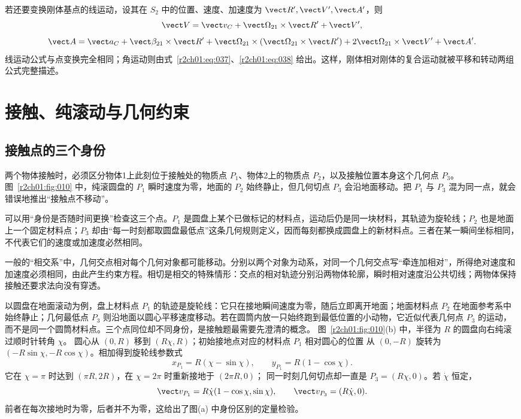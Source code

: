 若还要变换刚体基点的线运动，设其在 $S_2$ 中的位置、速度、加速度为
$\vect R',\vect V',\vect A'$，则
\[
  \vect V=\vect v_C+\vect\Omega_{21}\times\vect R'+\vect V',
\]
\[
  \vect A=\vect a_C+\vect\beta_{21}\times\vect R'
  +\vect\Omega_{21}\times(\vect\Omega_{21}\times\vect R')
  +2\vect\Omega_{21}\times\vect V'+\vect A'.
\]
线运动公式与点变换完全相同；角运动则由式~\eqref{r2ch01:eq:037}、\eqref{r2ch01:eq:038} 给出。这样，刚体相对刚体的复合运动就被平移和转动两组公式完整描述。

\section{接触、纯滚动与几何约束}
\label{r2ch01:sec:contact}

\subsection{接触点的三个身份}

两个物体接触时，必须区分物体1上此刻位于接触处的物质点 $P_1$、物体2上的物质点 $P_2$，以及接触位置本身这个几何点 $P_3$。图~\ref{r2ch01:fig:010} 中，纯滚圆盘的 $P_1$ 瞬时速度为零，地面的 $P_2$ 始终静止，但几何切点 $P_3$ 会沿地面移动。把 $P_1$ 与 $P_3$ 混为同一点，就会错误地推出“接触点不移动”。

可以用“身份是否随时间更换”检查这三个点。$P_1$ 是圆盘上某个已做标记的材料点，运动后仍是同一块材料，其轨迹为旋轮线；$P_2$ 也是地面上一个固定材料点；$P_3$ 却由“每一时刻都取圆盘最低点”这条几何规则定义，因而每刻都换成圆盘上的新材料点。三者在某一瞬间坐标相同，不代表它们的速度或加速度必然相同。

\figRollingPoints

一般的“相交系”中，几何交点相对每个几何对象都可能移动。分别以两个对象为动系，对同一个几何交点写“牵连加相对”，所得绝对速度和加速度必须相同，由此产生约束方程。相切是相交的特殊情形：交点的相对轨迹分别沿两物体轮廓，瞬时相对速度沿公共切线；两物体保持接触还要求法向没有穿透。

以圆盘在地面滚动为例，盘上材料点 $P_1$ 的轨迹是旋轮线：它只在接地瞬间速度为零，随后立即离开地面；地面材料点 $P_2$ 在地面参考系中始终静止；几何最低点 $P_3$ 则沿地面以圆心平移速度移动。若在圆筒内放一只始终跑到最低位置的小动物，它近似代表几何点 $P_3$ 的运动，而不是同一个圆筒材料点。三个点同位却不同身份，是接触题最需要先澄清的概念。
图~\ref{r2ch01:fig:010}(b) 中，半径为 $R$ 的圆盘向右纯滚过顺时针转角 $\chi$。
圆心从 $(0,R)$ 移到 $(R\chi,R)$；初始接地点对应的材料点 $P_1$ 相对圆心的位置
从 $(0,-R)$ 旋转为 $(-R\sin\chi,-R\cos\chi)$。相加得到旋轮线参数式
\[
 x_{P_1}=R(\chi-\sin\chi),\qquad y_{P_1}=R(1-\cos\chi).
\]
它在 $\chi=\pi$ 时达到 $(\pi R,2R)$，在 $\chi=2\pi$ 时重新接地于 $(2\pi R,0)$；
同一时刻几何切点却一直是 $P_3=(R\chi,0)$。若 $\dot\chi$ 恒定，
\[
 \vect v_{P_1}=R\dot\chi(1-\cos\chi,\sin\chi),\qquad
 \vect v_{P_3}=(R\dot\chi,0).
\]
前者在每次接地时为零，后者并不为零，这给出了图(a) 中身份区别的定量检验。

